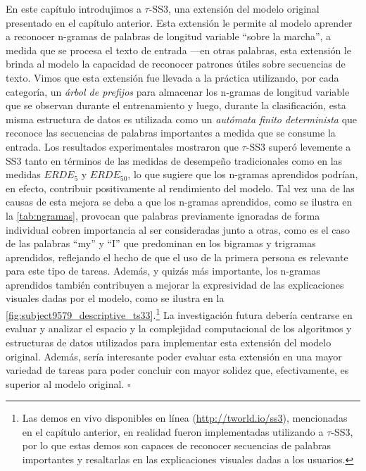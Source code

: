 En este capítulo introdujimos a $\tau$-SS3, una extensión del modelo original presentado en el capítulo anterior. Esta extensión le permite al modelo aprender a reconocer n-gramas de palabras de longitud variable ``sobre la marcha'', a medida que se procesa el texto de entrada ---en otras palabras, esta extensión le brinda al modelo la capacidad de reconocer patrones útiles sobre secuencias de texto.
Vimos que esta extensión fue llevada a la práctica utilizando, por cada categoría, un \emph{árbol de prefijos} para almacenar los n-gramas de longitud variable que se observan durante el entrenamiento y luego, durante la clasificación, esta misma estructura de datos es utilizada como un \emph{autómata finito determinista} que reconoce las secuencias de palabras importantes a medida que se consume la entrada.
Los resultados experimentales mostraron que $\tau$-SS3 superó levemente a SS3 tanto en términos de las medidas de desempeño tradicionales como en las medidas $ERDE_5$ y $ERDE_{50}$, lo que sugiere que los n-gramas aprendidos podrían, en efecto, contribuir positivamente al rendimiento del modelo.
Tal vez una de las causas de esta mejora se deba a que los n-gramas aprendidos, como se ilustra en la \autoref{tab:ngramas}, provocan que palabras previamente ignoradas de forma individual cobren importancia al ser consideradas junto a otras, como es el caso de las palabras ``my'' y ``I'' que predominan en los bigramas y trigramas aprendidos, reflejando el hecho de que el uso de la primera persona es relevante para este tipo de tareas.
Además, y quizás más importante, los n-gramas aprendidos también contribuyen a mejorar la expresividad de las explicaciones visuales dadas por el modelo, como se ilustra en la \autoref{fig:subject9579_descriptive_ts33}.\footnote{Las demos en vivo disponibles en línea (\href{http://tworld.io/ss3}{\url{http://tworld.io/ss3}}), mencionadas en el capítulo anterior, en realidad fueron implementadas utilizando a $\tau$-SS3, por lo que estas demos son capaces de reconocer secuencias de palabras importantes y resaltarlas en las explicaciones visuales dadas a los usuarios.}
La investigación futura debería centrarse en evaluar y analizar el espacio y la complejidad computacional de los algoritmos y estructuras de datos utilizados para implementar esta extensión del modelo original.
Además, sería interesante poder evaluar esta extensión en una mayor variedad de tareas para poder concluir con mayor solidez que, efectivamente, es superior al modelo original.
\hfill$\square$



